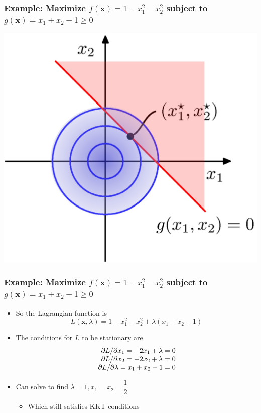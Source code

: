 \documentclass[12pt,notes,mathserif]{beamer}
\begin{document}
\begin{frame}[c]
	\frametitle{Example: Maximize $f(\mathbf{x})=1-x_1^2-x_2^2$ subject to $g(\mathbf{x})=x_1+x_2-1\geqslant{}0$}
	\begin{center}
		\includegraphics[width=0.65\linewidth]{fig8/lec835.jpg}
	\end{center}
\end{frame}


\begin{frame}[c]
	\frametitle{Example: Maximize $f(\mathbf{x})=1-x_1^2-x_2^2$ subject to $g(\mathbf{x})=x_1+x_2-1\geqslant{}0$}
	\begin{itemize}
		\item So the Lagrangian function is
		      \[
			      L(\mathbf{x},\lambda)=1-x_1^2-x_2^2+\lambda(x_1+x_2-1)
		      \]
		\item The conditions for $L$ to be stationary are
		      \[
			      \begin{array}{r@{~}l}
				      \partial L/\partial x_1=-2x_1+\lambda=0 \\
				      \partial L/\partial x_2=-2x_2+\lambda=0 \\
				      \partial L/\partial \lambda=x_1+x_2-1=0 \\
			      \end{array}
		      \]
		\item Can solve to find $\lambda=1,x_1=x_2=\dfrac{1}{2}$
		      \begin{itemize}
			      \item Which still satisfies KKT conditions
		      \end{itemize}
	\end{itemize}
\end{frame}
\end{document}
